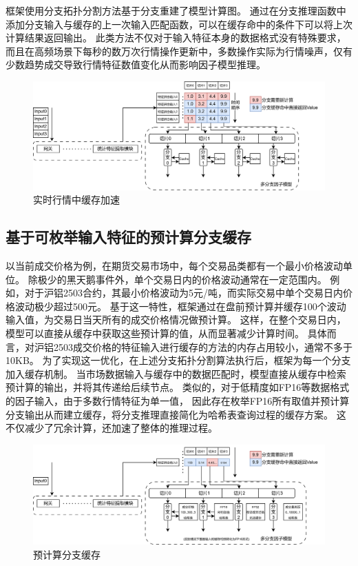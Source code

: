 框架使用分支拓扑分割方法基于分支重建了模型计算图。
通过在分支推理函数中添加分支输入与缓存的上一次输入匹配函数，可以在缓存命中的条件下可以将上次计算结果返回输出。
此类方法不仅对于输入特征本身的数据格式没有特殊要求，
而且在高频场景下每秒的数万次行情操作更新中，多数操作实际为行情噪声，仅有少数趋势成交导致行情特征数值变化从而影响因子模型推理。
\begin{figure}[h]
    \centering
    \includegraphics[width=1\textwidth]{image/chap03/high.png}
    \caption{实时行情中缓存加速}
    \label{fig:hole}
\end{figure}


\subsection{基于可枚举输入特征的预计算分支缓存}

以当前成交价格为例，在期货交易市场中，每个交易品类都有一个最小价格波动单位。
除极少的黑天鹅事件外，单个交易日内的价格波动通常在一定范围内。
例如，对于沪铝2503合约，其最小价格波动为5元/吨，而实际交易中单个交易日内价格波动极少超过500元。
基于这一特性，框架通过在盘前预计算并缓存100个波动输入值，为交易日当天所有的成交价格情况做预计算。
这样，在整个交易日内，模型可以直接从缓存中获取这些预计算的值，从而显著减少计算时间。
具体而言，对沪铝2503成交价格的特征输入进行缓存的方法的内存占用较小，通常不多于10KB。
为了实现这一优化，在上述分支拓扑分割算法执行后，框架为每一个分支加入缓存机制。
当市场数据输入与缓存中的数据匹配时，模型直接从缓存中检索预计算的输出，并将其传递给后续节点。
类似的，对于低精度如FP16等数据格式的因子输入，由于多数行情特征为单一值，
因此存在枚举FP16所有取值并预计算分支输出从而建立缓存，将分支推理直接简化为哈希表查询过程的缓存方案。
这不仅减少了冗余计算，还加速了整体的推理过程。
\begin{figure}[h]
    \centering
    \includegraphics[width=1\textwidth]{image/chap03/precom.png}
    \caption{预计算分支缓存}
    \label{fig:hole}
\end{figure}

